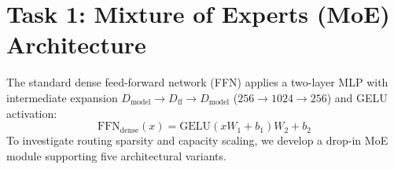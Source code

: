 \documentclass[11pt,a4paper]{article}
\begin{document}
\section{Task 1: Mixture of Experts (MoE) Architecture}

The standard dense feed-forward network (FFN) applies a two-layer MLP with intermediate expansion $D_{\text{model}} \to D_{\text{ff}} \to D_{\text{model}}$ ($256 \to 1024 \to 256$) and GELU activation:
\begin{equation}
\text{FFN}_{\text{dense}}(x) = \text{GELU}(x W_1 + b_1) W_2 + b_2
\end{equation}
To investigate routing sparsity and capacity scaling, we develop a drop-in MoE module supporting five architectural variants.

\begin{table}[h]
\centering
\small
\caption{Architectural FFN configurations and capacity accounting ($D_{\text{model}}=256, D_{\text{ff}}=1024$).}
\label{tab:moe_configs}
\end{table}
\end{document}
